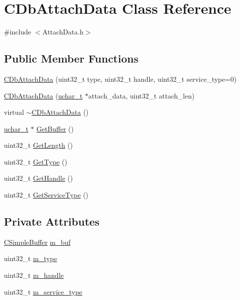 \hypertarget{class_c_db_attach_data}{}\section{C\+Db\+Attach\+Data Class Reference}
\label{class_c_db_attach_data}


{\ttfamily \#include $<$Attach\+Data.\+h$>$}

\subsection*{Public Member Functions}
\begin{DoxyCompactItemize}
\item 
\hyperlink{class_c_db_attach_data_ac7fb9057ab2f3f1ea23823095333af79}{C\+Db\+Attach\+Data} (uint32\+\_\+t type, uint32\+\_\+t handle, uint32\+\_\+t service\+\_\+type=0)
\item 
\hyperlink{class_c_db_attach_data_a990daa2a5dfca22b32f904e5edceee1a}{C\+Db\+Attach\+Data} (\hyperlink{base_2ostype_8h_a124ea0f8f4a23a0a286b5582137f0b8d}{uchar\+\_\+t} $\ast$attach\+\_\+data, uint32\+\_\+t attach\+\_\+len)
\item 
virtual \hyperlink{class_c_db_attach_data_af617ae54b276921f7febec9686161747}{$\sim$\+C\+Db\+Attach\+Data} ()
\item 
\hyperlink{base_2ostype_8h_a124ea0f8f4a23a0a286b5582137f0b8d}{uchar\+\_\+t} $\ast$ \hyperlink{class_c_db_attach_data_a8995435926ba31bdbfc5326d5d8759f8}{Get\+Buffer} ()
\item 
uint32\+\_\+t \hyperlink{class_c_db_attach_data_a796c4f5cdd000fdf26df51acae4ee038}{Get\+Length} ()
\item 
uint32\+\_\+t \hyperlink{class_c_db_attach_data_a3ffd51930a56ec0813bac9aee997d0f6}{Get\+Type} ()
\item 
uint32\+\_\+t \hyperlink{class_c_db_attach_data_a3a9d55d19dc472a503b4fc9facf805b9}{Get\+Handle} ()
\item 
uint32\+\_\+t \hyperlink{class_c_db_attach_data_ad1e36fdd239534c2b687fce1cb9676b8}{Get\+Service\+Type} ()
\end{DoxyCompactItemize}
\subsection*{Private Attributes}
\begin{DoxyCompactItemize}
\item 
\hyperlink{class_c_simple_buffer}{C\+Simple\+Buffer} \hyperlink{class_c_db_attach_data_a0613ca11b373ed6950dceefd447a1c0f}{m\+\_\+buf}
\item 
uint32\+\_\+t \hyperlink{class_c_db_attach_data_a4d7de732ecb1ddd4387e38394348ad24}{m\+\_\+type}
\item 
uint32\+\_\+t \hyperlink{class_c_db_attach_data_add12f3381fed86933831980f292013e0}{m\+\_\+handle}
\item 
uint32\+\_\+t \hyperlink{class_c_db_attach_data_aa5ede3c5ce31efb0a6757a09778c5aa3}{m\+\_\+service\+\_\+type}
\end{DoxyCompactItemize}


